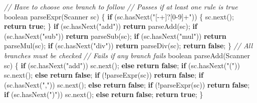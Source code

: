 \documentclass[
]{book}
\newenvironment{Shaded}{\begin{snugshade}}{\end{snugshade}}
\newcommand{\BuiltInTok}[1]{#1}
\newcommand{\CommentTok}[1]{\textcolor[rgb]{0.56,0.35,0.01}{\textit{#1}}}
\newcommand{\DataTypeTok}[1]{\textcolor[rgb]{0.13,0.29,0.53}{#1}}
\newcommand{\FunctionTok}[1]{\textcolor[rgb]{0.00,0.00,0.00}{#1}}
\newcommand{\KeywordTok}[1]{\textcolor[rgb]{0.13,0.29,0.53}{\textbf{#1}}}
\newcommand{\NormalTok}[1]{#1}
\newcommand{\StringTok}[1]{\textcolor[rgb]{0.31,0.60,0.02}{#1}}
\begin{document}
\begin{Shaded}
\begin{Highlighting}[]
\CommentTok{// Have to choose one branch to follow}
\CommentTok{// Passes if at least one rule is true}
\DataTypeTok{boolean} \FunctionTok{parseExpr}\NormalTok{(}\BuiltInTok{Scanner}\NormalTok{ sc) \{ }
  \KeywordTok{if}\NormalTok{ (sc.}\FunctionTok{hasNext}\NormalTok{(}\StringTok{"[{-}+]?[0{-}9]+"}\NormalTok{)) \{}
\NormalTok{    sc.}\FunctionTok{next}\NormalTok{();}
    \KeywordTok{return} \KeywordTok{true}\NormalTok{;}
\NormalTok{  \}}
  \KeywordTok{if}\NormalTok{ (sc.}\FunctionTok{hasNext}\NormalTok{(}\StringTok{"add"}\NormalTok{))}
    \KeywordTok{return} \FunctionTok{parseAdd}\NormalTok{(sc);}
  \KeywordTok{if}\NormalTok{ (sc.}\FunctionTok{hasNext}\NormalTok{(}\StringTok{"sub"}\NormalTok{))}
    \KeywordTok{return} \FunctionTok{parseSub}\NormalTok{(sc); }
  \KeywordTok{if}\NormalTok{ (sc.}\FunctionTok{hasNext}\NormalTok{(}\StringTok{"mul"}\NormalTok{))}
    \KeywordTok{return} \FunctionTok{parseMul}\NormalTok{(sc);}
  \KeywordTok{if}\NormalTok{ (sc.}\FunctionTok{hasNext}\NormalTok{(}\StringTok{"div"}\NormalTok{))}
    \KeywordTok{return} \FunctionTok{parseDiv}\NormalTok{(sc);}
  \KeywordTok{return} \KeywordTok{false}\NormalTok{;}
\NormalTok{\}}
\CommentTok{// All branches must be checked }
\CommentTok{// Fails if any branch fails}
\DataTypeTok{boolean} \FunctionTok{parseAdd}\NormalTok{(}\BuiltInTok{Scanner}\NormalTok{ sc) \{}
   \KeywordTok{if}\NormalTok{ (sc.}\FunctionTok{hasNext}\NormalTok{(}\StringTok{"add"}\NormalTok{))}
\NormalTok{    sc.}\FunctionTok{next}\NormalTok{();}
   \KeywordTok{else}
    \KeywordTok{return} \KeywordTok{false}\NormalTok{;}
   \KeywordTok{if}\NormalTok{ (sc.}\FunctionTok{hasNext}\NormalTok{(}\StringTok{"("}\NormalTok{))}
\NormalTok{    sc.}\FunctionTok{next}\NormalTok{();}
   \KeywordTok{else}
    \KeywordTok{return} \KeywordTok{false}\NormalTok{;}
   \KeywordTok{if}\NormalTok{ (!}\FunctionTok{parseExpr}\NormalTok{(sc))}
    \KeywordTok{return} \KeywordTok{false}\NormalTok{;}
   \KeywordTok{if}\NormalTok{ (sc.}\FunctionTok{hasNext}\NormalTok{(}\StringTok{","}\NormalTok{))}
\NormalTok{    sc.}\FunctionTok{next}\NormalTok{();}
   \KeywordTok{else}
    \KeywordTok{return} \KeywordTok{false}\NormalTok{;}
   \KeywordTok{if}\NormalTok{ (!}\FunctionTok{parseExpr}\NormalTok{(sc))}
    \KeywordTok{return} \KeywordTok{false}\NormalTok{;}
  \KeywordTok{if}\NormalTok{ (sc.}\FunctionTok{hasNext}\NormalTok{(}\StringTok{")"}\NormalTok{))}
\NormalTok{    sc.}\FunctionTok{next}\NormalTok{();}
   \KeywordTok{else}
    \KeywordTok{return} \KeywordTok{false}\NormalTok{;}
   \KeywordTok{return} \KeywordTok{true}\NormalTok{;}
\NormalTok{\} }
\end{Highlighting}
\end{Shaded}
\end{document}
